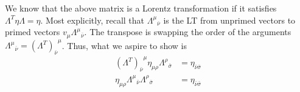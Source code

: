 \documentclass[12pt]{report}
\begin{document}
\begin{description}
        We know that the above matrix is a Lorentz transformation if it
        satisfies $\Lambda^T \eta \Lambda = \eta$. Most explicitly, recall that
        ${\Lambda^\mu}_{\overline{\nu}}$ is the LT from unprimed vectors to
        primed vectors $v_\mu {\Lambda^\mu}_{\overline{\nu}}$. The transpose is
        swapping the order of the arguments ${\Lambda^\mu}_{\overline{\nu}}
        = {(\Lambda^T)_{\overline{\nu}}}^\mu$. Thus, what we aspire to show is
        \begin{align}
            {(\Lambda^T)_{\bar{\nu}}}^\mu \eta_{\mu\rho}
                {\Lambda^\rho}_{\bar{\sigma}} &=
                \eta_{\bar{\nu}\bar{\sigma}}\\
            \eta_{\mu\rho} {\Lambda^\mu}_{\bar{\nu}}
                {\Lambda^\rho}_{\bar{\sigma}} &= \eta_{\bar{\nu}\bar{\sigma}}
        \end{align}


\end{description}
\end{document}
